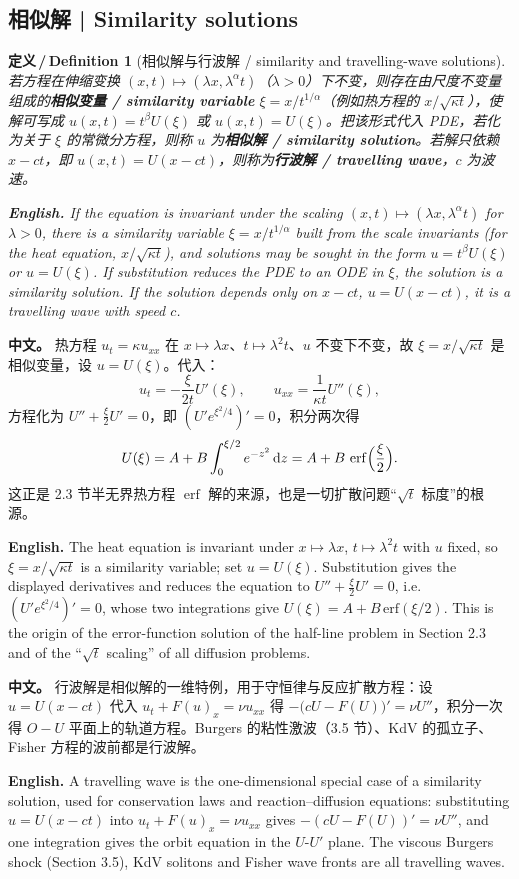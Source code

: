 \documentclass[UTF8,11pt,a4paper]{ctexart}
\newcommand{\APS}[2]{\par\noindent\textbf{中文。} #1\par\noindent\textbf{English.} #2\par\smallskip}
\newcommand{\EN}[1]{\par\noindent \textbf{English.} #1\par}
\newtheorem{definition}{定义\,/\,Definition}[section]
\newcommand{\dd}{\mathrm{d}}
\begin{document}
\subsection{相似解 | Similarity solutions}
\begin{definition}[相似解与行波解 / similarity and travelling-wave solutions]\label{def:similarity}
若方程在伸缩变换 $(x,t)\mapsto(\lambda x,\lambda^\alpha t)$（$\lambda>0$）下不变，则存在由尺度不变量组成的\textbf{相似变量 / similarity variable} $\xi=x/t^{1/\alpha}$（例如热方程的 $x/\sqrt{\kappa t}$），使解可写成 $u(x,t)=t^{\beta}U(\xi)$ 或 $u(x,t)=U(\xi)$。把该形式代入 PDE，若化为关于 $\xi$ 的常微分方程，则称 $u$ 为\textbf{相似解 / similarity solution}。若解只依赖 $x-ct$，即 $u(x,t)=U(x-ct)$，则称为\textbf{行波解 / travelling wave}，$c$ 为波速。
\EN{If the equation is invariant under the scaling $(x,t)\mapsto(\lambda x,\lambda^\alpha t)$ for $\lambda>0$, there is a similarity variable $\xi=x/t^{1/\alpha}$ built from the scale invariants (for the heat equation, $x/\sqrt{\kappa t}$), and solutions may be sought in the form $u=t^\beta U(\xi)$ or $u=U(\xi)$. If substitution reduces the PDE to an ODE in $\xi$, the solution is a similarity solution. If the solution depends only on $x-ct$, $u=U(x-ct)$, it is a travelling wave with speed $c$.}
\end{definition}

\APS{热方程 $u_t=\kappa u_{xx}$ 在 $x\mapsto\lambda x$、$t\mapsto\lambda^2t$、$u$ 不变下不变，故 $\xi=x/\sqrt{\kappa t}$ 是相似变量，设 $u=U(\xi)$。代入：
\[
u_t=-\frac{\xi}{2t}U'(\xi),\qquad u_{xx}=\frac{1}{\kappa t}U''(\xi),
\]
方程化为 $U''+\frac{\xi}{2}U'=0$，即 $(U'e^{\xi^2/4})'=0$，积分两次得
\[
U(\xi)=A+B\int_0^{\xi/2}e^{-z^2}\,\dd z=A+B\,\operatorname{erf}\Bigl(\frac{\xi}{2}\Bigr).
\]
这正是 2.3 节半无界热方程 $\operatorname{erf}$ 解的来源，也是一切扩散问题``$\sqrt t$ 标度''的根源。}{The heat equation is invariant under $x\mapsto\lambda x$, $t\mapsto\lambda^2t$ with $u$ fixed, so $\xi=x/\sqrt{\kappa t}$ is a similarity variable; set $u=U(\xi)$. Substitution gives the displayed derivatives and reduces the equation to $U''+\frac{\xi}{2}U'=0$, i.e. $(U'e^{\xi^2/4})'=0$, whose two integrations give $U(\xi)=A+B\,\mathrm{erf}(\xi/2)$. This is the origin of the error-function solution of the half-line problem in Section 2.3 and of the ``$\sqrt t$ scaling'' of all diffusion problems.}

\APS{行波解是相似解的一维特例，用于守恒律与反应扩散方程：设 $u=U(x-ct)$ 代入 $u_t+F(u)_x=\nu u_{xx}$ 得 $-\bigl(cU-F(U)\bigr)'=\nu U''$，积分一次得 $O-U$ 平面上的轨道方程。Burgers 的粘性激波（3.5 节）、KdV 的孤立子、Fisher 方程的波前都是行波解。}{A travelling wave is the one-dimensional special case of a similarity solution, used for conservation laws and reaction--diffusion equations: substituting $u=U(x-ct)$ into $u_t+F(u)_x=\nu u_{xx}$ gives $-(cU-F(U))'=\nu U''$, and one integration gives the orbit equation in the $U$-$U'$ plane. The viscous Burgers shock (Section 3.5), KdV solitons and Fisher wave fronts are all travelling waves.}
\end{document}
